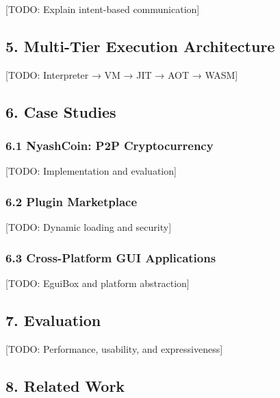 \documentclass[
]{article}
\begin{document}
{[}TODO: Explain intent-based communication{]}

\hypertarget{multi-tier-execution-architecture}{%
\subsection{5. Multi-Tier Execution
Architecture}\label{multi-tier-execution-architecture}}

{[}TODO: Interpreter → VM → JIT → AOT → WASM{]}

\hypertarget{case-studies}{%
\subsection{6. Case Studies}\label{case-studies}}

\hypertarget{nyashcoin-p2p-cryptocurrency}{%
\subsubsection{6.1 NyashCoin: P2P
Cryptocurrency}\label{nyashcoin-p2p-cryptocurrency}}

{[}TODO: Implementation and evaluation{]}

\hypertarget{plugin-marketplace}{%
\subsubsection{6.2 Plugin Marketplace}\label{plugin-marketplace}}

{[}TODO: Dynamic loading and security{]}

\hypertarget{cross-platform-gui-applications}{%
\subsubsection{6.3 Cross-Platform GUI
Applications}\label{cross-platform-gui-applications}}

{[}TODO: EguiBox and platform abstraction{]}

\hypertarget{evaluation}{%
\subsection{7. Evaluation}\label{evaluation}}

{[}TODO: Performance, usability, and expressiveness{]}

\hypertarget{related-work}{%
\subsection{8. Related Work}\label{related-work}}
\end{document}
